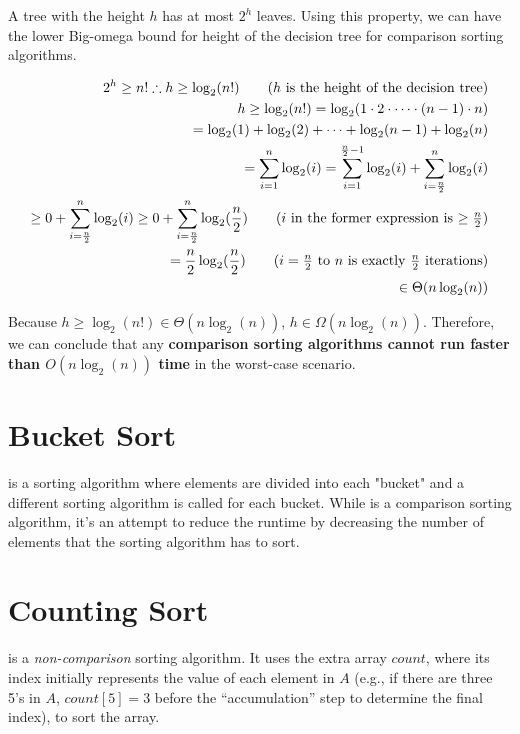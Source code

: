 \documentclass{report}
\begin{document}
A tree with the height $h$ has at most $2^{h}$ leaves. Using this property, we can have the lower Big-omega bound for height of the decision tree for comparison sorting algorithms.

\begin{align*}
  2^{h} \geq n! \therefore h \geq \log_{2}(n!) \tag{$h$ is the height of the decision tree} \\
  h \geq \log_{2}(n!) = \log_{2}(1 \cdot 2 \cdot \cdots \cdot (n - 1) \cdot n) \\
  = \log_{2}(1) + \log_{2}(2) + \cdots + \log_{2}(n - 1) + \log_{2}(n) \\
  = \sum_{i = 1}^{n} \log_{2}(i) = \sum_{i = 1}^{\frac{n}{2} - 1} \log_{2}(i) + \sum_{i = \frac{n}{2}}^{n} \log_{2}(i) \\
  \geq 0 + \sum_{i = \frac{n}{2}}^{n} \log_{2}(i) \geq 0 + \sum_{i = \frac{n}{2}}^{n} \log_{2}(\frac{n}{2}) \tag{$i$ in the former expression is $\geq \frac{n}{2}$} \\
  = \frac{n}{2} \log_{2}(\frac{n}{2}) \tag{$i = \frac{n}{2}$ to $n$ is exactly $\frac{n}{2}$ iterations} \\
  \in \Theta(n \log_{2}(n))
\end{align*}

Because $h \geq \log_{2}(n!) \in \Theta(n \log_{2}(n))$, $h \in \Omega(n \log_{2}(n))$. Therefore, we can conclude that any \textbf{comparison sorting algorithms cannot run faster than $O(n \log_{2}(n))$ time} in the worst-case scenario.

\section{Bucket Sort}

 is a sorting algorithm where elements are divided into each "bucket" and a different sorting algorithm is called for each bucket. While  is a comparison sorting algorithm, it's an attempt to reduce the runtime by decreasing the number of elements that the sorting algorithm has to sort.

\section{Counting Sort}

 is a \textit{non-comparison} sorting algorithm. It uses the extra array $count$, where its index initially represents the value of each element in $A$ (e.g., if there are three 5's in $A$, $count[5] = 3$ before the ``accumulation'' step to determine the final index), to sort the array.
\end{document}
